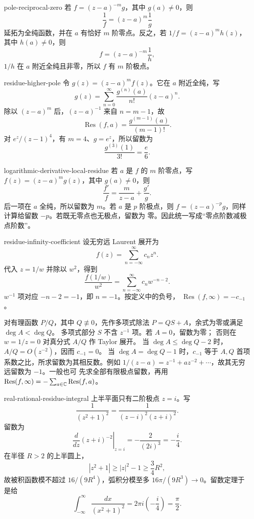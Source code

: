 \begin{solution}{pole-reciprocal-zero}
若 \(f=(z-a)^{-m}g\)，其中 \(g(a)\ne0\)，则
\[
 \frac1f=(z-a)^m\frac1g
\]
延拓为全纯函数，并在 \(a\) 有恰好 \(m\) 阶零点。反之，若
\(1/f=(z-a)^mh(z)\)，其中 \(h(a)\ne0\)，则
\[
 f=(z-a)^{-m}\frac1h,
\]
\(1/h\) 在 \(a\) 附近全纯且非零，所以 \(f\) 有 \(m\) 阶极点。
\end{solution}

\begin{solution}{residue-higher-pole}
令 \(g(z)=(z-a)^mf(z)\)。它在 \(a\) 附近全纯，写
\[
 g(z)=\sum_{n=0}^{\infty}\frac{g^{(n)}(a)}{n!}(z-a)^n.
\]
除以 \((z-a)^m\) 后，\((z-a)^{-1}\) 来自 \(n=m-1\)，故
\[
 \operatorname{Res}(f,a)=\frac{g^{(m-1)}(a)}{(m-1)!}.
\]
对 \(e^z/(z-1)^4\)，有 \(m=4\)、\(g=e^z\)，所以留数为
\[
 \frac{g^{(3)}(1)}{3!}=\frac e6.
\]
\end{solution}

\begin{solution}{logarithmic-derivative-local-residue}
若 \(a\) 是 \(f\) 的 \(m\) 阶零点，写
\(f(z)=(z-a)^mg(z)\)，其中 \(g(a)\ne0\)，则
\[
 \frac{f'}f=\frac m{z-a}+\frac{g'}g.
\]
后一项在 \(a\) 全纯，所以留数为 \(m\)。若 \(a\) 是 \(p\) 阶极点，则
\(f=(z-a)^{-p}g\)，同样计算给留数 \(-p\)。若既无零点也无极点，留数为
零。因此统一写成“零点阶数减极点阶数”。
\end{solution}

\begin{solution}{residue-infinity-coefficient}
设无穷远 Laurent 展开为
\[
 f(z)=\sum_{n=-\infty}^{\infty}c_nz^n.
\]
代入 \(z=1/w\) 并除以 \(w^2\)，得到
\[
 \frac{f(1/w)}{w^2}=\sum_{n=-\infty}^{\infty}c_nw^{-n-2}.
\]
\(w^{-1}\) 项对应 \(-n-2=-1\)，即 \(n=-1\)。按定义中的负号，
\(\operatorname{Res}(f,\infty)=-c_{-1}\)。

对有理函数 \(P/Q\)，其中 \(Q\not\equiv0\)，先作多项式除法
\(P=QS+A\)，余式为零或满足 \(\deg A<\deg Q\)。
多项式部分 \(S\) 不含 \(z^{-1}\) 项。若 \(A=0\)，留数为零；
否则在 \(w=1/z=0\) 对真分式 \(A/Q\) 作 Taylor 展开。
当 \(\deg A\le\deg Q-2\) 时，\(A/Q=O(z^{-2})\)，因而 \(c_{-1}=0\)。
当 \(\deg A=\deg Q-1\) 时，\(c_{-1}\) 等于 \(A,Q\)
首项系数之比，所求留数为其相反数。例如
\(1/(z-a)=z^{-1}+az^{-2}+\cdots\)，故其无穷远留数为 \(-1\)。一般也可
先求全部有限极点留数，再用
\(\operatorname{Res}(f,\infty)=-\sum_{a\in\mathbb{C}}\operatorname{Res}(f,a)\)。
\end{solution}

\begin{solution}{real-rational-residue-integral}
上半平面只有二阶极点 \(z=i\)。写
\[
 \frac1{(z^2+1)^2}
 =\frac1{(z-i)^2(z+i)^2}.
\]
留数为
\[
 \left.\frac d{dz}(z+i)^{-2}\right|_{z=i}
 =-\frac2{(2i)^3}=-\frac i4.
\]
在半径 \(R>2\) 的上半圆上，
\[
 |z^2+1|\ge |z|^2-1\ge\frac34R^2,
\]
故被积函数模不超过 \(16/(9R^4)\)，弧积分模至多
\(16\pi/(9R^3)\to0\)。留数定理于是给
\[
 \int_{-\infty}^{\infty}\frac{dx}{(x^2+1)^2}
 =2\pi i\left(-\frac i4\right)=\frac\pi2.
\]
\end{solution}

